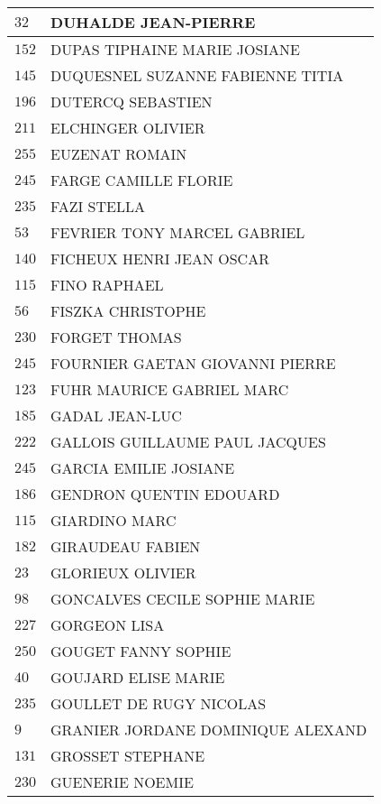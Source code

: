 \begin{xltabular}{\linewidth}{|l|X|}
    \hline
    $32$ & DUHALDE JEAN-PIERRE \\
    \hline
    $152$ & DUPAS TIPHAINE MARIE JOSIANE \\
    \hline
    $145$ & DUQUESNEL SUZANNE FABIENNE TITIA \\
    \hline
    $196$ & DUTERCQ SEBASTIEN \\
    \hline
    $211$ & ELCHINGER OLIVIER \\
    \hline
    $255$ & EUZENAT ROMAIN \\
    \hline
    $245$ & FARGE CAMILLE FLORIE \\
    \hline
    $235$ & FAZI STELLA \\
    \hline
    $53$ & FEVRIER TONY MARCEL GABRIEL \\
    \hline
    $140$ & FICHEUX HENRI JEAN OSCAR \\
    \hline
    $115$ & FINO RAPHAEL \\
    \hline
    $56$ & FISZKA CHRISTOPHE \\
    \hline
    $230$ & FORGET THOMAS \\
    \hline
    $245$ & FOURNIER GAETAN GIOVANNI PIERRE \\
    \hline
    $123$ & FUHR MAURICE GABRIEL MARC \\
    \hline
    $185$ & GADAL JEAN-LUC \\
    \hline
    $222$ & GALLOIS GUILLAUME PAUL JACQUES \\
    \hline
    $245$ & GARCIA EMILIE JOSIANE \\
    \hline
    $186$ & GENDRON QUENTIN EDOUARD \\
    \hline
    $115$ & GIARDINO MARC \\
    \hline
    $182$ & GIRAUDEAU FABIEN \\
    \hline
    $23$ & GLORIEUX OLIVIER \\
    \hline
    $98$ & GONCALVES CECILE SOPHIE MARIE \\
    \hline
    $227$ & GORGEON LISA \\
    \hline
    $250$ & GOUGET FANNY SOPHIE \\
    \hline
    $40$ & GOUJARD ELISE MARIE \\
    \hline
    $235$ & GOULLET DE RUGY NICOLAS \\
    \hline
    $9$ & GRANIER JORDANE DOMINIQUE ALEXAND \\
    \hline
    $131$ & GROSSET STEPHANE \\
    \hline
    $230$ & GUENERIE NOEMIE \\

\end{xltabular}
